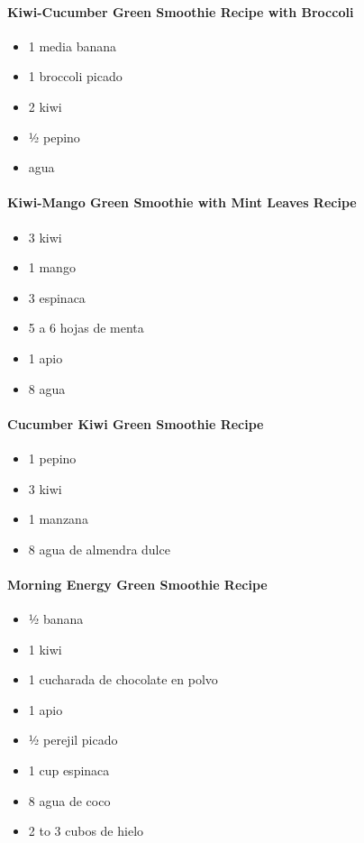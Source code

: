 \paragraph{\texorpdfstring{\textbf{Kiwi-Cucumber Green Smoothie Recipe
with
Broccoli}}{Kiwi-Cucumber Green Smoothie Recipe with Broccoli}}\label{kiwi-cucumber-green-smoothie-recipe-with-broccoli}

\begin{itemize}
\item
  1 media banana
\item
  1 broccoli picado
\item
  2 kiwi
\item
  ½ pepino
\item
  agua
\end{itemize}

\paragraph{\texorpdfstring{\textbf{Kiwi-Mango Green Smoothie with Mint
Leaves
Recipe}}{Kiwi-Mango Green Smoothie with Mint Leaves Recipe}}\label{kiwi-mango-green-smoothie-with-mint-leaves-recipe}

\begin{itemize}
\item
  3 kiwi
\item
  1 mango
\item
  3 espinaca
\item
  5 a 6 hojas de menta
\item
  1 apio
\item
  8 agua
\end{itemize}

\paragraph{\texorpdfstring{\textbf{Cucumber Kiwi Green Smoothie
Recipe}}{Cucumber Kiwi Green Smoothie Recipe}}\label{cucumber-kiwi-green-smoothie-recipe}

\begin{itemize}
\item
  1 pepino
\item
  3 kiwi
\item
  1 manzana
\item
  8 agua de almendra dulce
\end{itemize}

\paragraph{\texorpdfstring{\textbf{Morning Energy Green Smoothie
Recipe}}{Morning Energy Green Smoothie Recipe}}\label{morning-energy-green-smoothie-recipe}

\begin{itemize}
\item
  ½ banana
\item
  1 kiwi
\item
  1 cucharada de chocolate en polvo
\item
  1 apio
\item
  ½ perejil picado
\item
  1 cup espinaca
\item
  8 agua de coco
\item
  2 to 3 cubos de hielo
\end{itemize}
